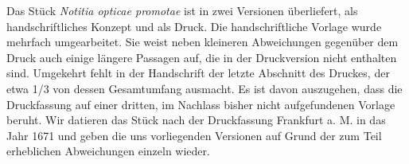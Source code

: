 \pstart Das St\"{u}ck \textit{Notitia opticae promotae} ist in zwei Versionen \"{u}berliefert, als handschriftliches Konzept und als Druck. Die handschriftliche Vorlage wurde mehrfach umgearbeitet. Sie weist neben kleineren Abweichungen gegen\"{u}ber dem Druck auch einige l\"{a}ngere Passagen auf, die in der Druckversion nicht enthalten sind. Umgekehrt fehlt in der Handschrift der letzte Abschnitt des Druckes, der etwa 1/3 von dessen Gesamtumfang ausmacht. Es ist davon auszugehen, dass die Druckfassung auf einer dritten, im Nachlass bisher nicht aufgefundenen Vorlage beruht. Wir datieren das St\"{u}ck nach der Druckfassung Frankfurt a. M. in das Jahr 1671 und geben die uns vorliegenden Versionen auf Grund der zum Teil erheblichen Abweichungen einzeln wieder.\pend